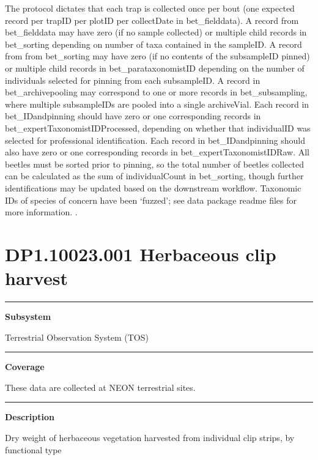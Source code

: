 \documentclass[]{article}
\begin{document}
The protocol dictates that each trap is collected once per bout (one
expected record per trapID per plotID per collectDate in
bet\_fielddata). A record from bet\_fielddata may have zero (if no
sample collected) or multiple child records in bet\_sorting depending on
number of taxa contained in the sampleID. A record from from
bet\_sorting may have zero (if no contents of the subsampleID pinned) or
multiple child records in bet\_parataxonomistID depending on the number
of individuals selected for pinning from each subsampleID. A record in
bet\_archivepooling may correspond to one or more records in
bet\_subsampling, where multiple subsampleIDs are pooled into a single
archiveVial. Each record in bet\_IDandpinning should have zero or one
corresponding records in bet\_expertTaxonomistIDProcessed, depending on
whether that individualID was selected for professional identification.
Each record in bet\_IDandpinning should also have zero or one
corresponding records in bet\_expertTaxonomistIDRaw. All beetles must be
sorted prior to pinning, so the total number of beetles collected can be
calculated as the sum of individualCount in bet\_sorting, though further
identifications may be updated based on the downstream workflow.
Taxonomic IDs of species of concern have been `fuzzed'; see data package
readme files for more information. \newpage
.

\section{DP1.10023.001 Herbaceous clip
harvest}\label{dp1.10023.001-herbaceous-clip-harvest}

\begin{center}\rule{0.5\linewidth}{\linethickness}\end{center}

\textbf{Subsystem}

Terrestrial Observation System (TOS)

\begin{center}\rule{0.5\linewidth}{\linethickness}\end{center}

\textbf{Coverage}

These data are collected at NEON terrestrial sites.

\begin{center}\rule{0.5\linewidth}{\linethickness}\end{center}

\textbf{Description}

Dry weight of herbaceous vegetation harvested from individual clip
strips, by functional type
\end{document}
